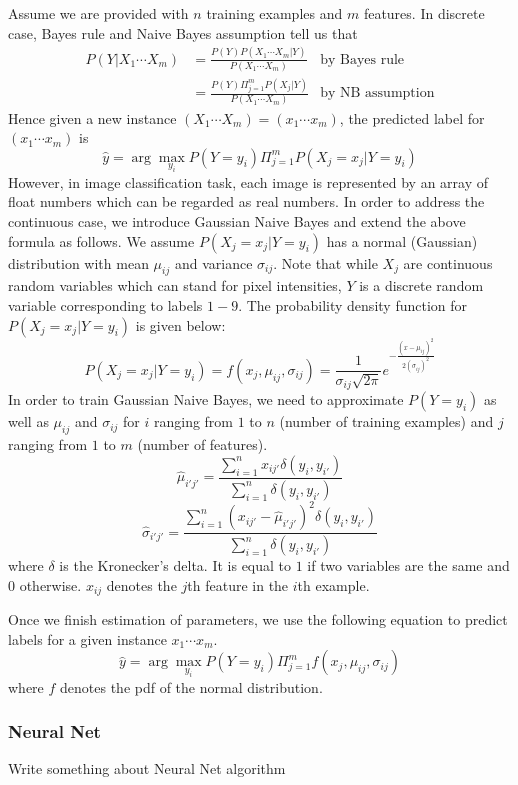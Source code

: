 \documentclass{acm_proc_article-sp}
\begin{document}
Assume we are provided with $n$ training examples and $m$ features. In discrete case, Bayes rule and Naive Bayes assumption tell us that
\begin{align*}
P(Y | X_1 \cdots X_m ) &= \frac{P(Y) P ( X_1 \cdots X_m| Y )}{P(X_1 \cdots X_m)} &\textrm{by Bayes rule}\\
&= \frac{P(Y) \Pi_{j=1}^m  P ( X_j | Y )}{P(X_1 \cdots X_m)} &\textrm{by NB assumption}
\end{align*}
Hence given a new instance $(X_1\cdots X_m) = (x_1\cdots x_m)$, the predicted label for $(x_1\cdots x_m)$ is
\[
\hat{y} = \arg \max_{y_i} P(Y = y_i) \Pi_{j=1}^m P(X_j=x_j | Y = y_i)
\]
However, in image classification task, each image is represented by an array of float numbers which can be regarded as real numbers. In order to address the continuous case, we introduce Gaussian Naive Bayes and extend the above formula as follows. We assume $P(X_j=x_j | Y = y_i)$ has a normal (Gaussian) distribution with mean $\mu_{ij}$ and variance $\sigma_{ij}$. Note that while $X_j$ are continuous random variables which can stand for pixel intensities,  $Y$ is a discrete random variable corresponding to labels $1 - 9$.  The probability density function for $P(X_j=x_j | Y = y_i)$ is given below:
\[
P(X_j=x_j | Y = y_i) =  f (x_j, \mu_{ij}, \sigma_{ij} ) =\frac{1}{\sigma_{ij}\sqrt{2\pi}}e^{-\frac{(x-\mu_{ij})^2}{2(\sigma_{ij})^2}}
\]
In order to train Gaussian Naive Bayes, we need to approximate $P(Y=y_i)$ as well as $\mu_{ij}$ and  $\sigma_{ij}$ for $i$ ranging from $1$ to $n$ (number of training examples) and $j$ ranging from $1$ to $m$ (number of features). 
\[
\hat{\mu}_{i'j'} = \frac{\sum_{i=1}^n x_{ij'} \delta(y_{i}, y_{i'})}{\sum_{i=1}^n \delta(y_{i}, y_{i'})}
\]
\[
\hat{\sigma}_{i'j'} =  \frac{\sum_{i=1}^n ( x_{ij'}-\hat{\mu}_{i'j'})^2 \delta(y_{i}, y_{i'})}{\sum_{i=1}^n \delta(y_{i}, y_{i'})}
\]
where $\delta$ is the Kronecker's delta. It is equal to $1$ if two variables are the same and $0$ otherwise. $x_{ij}$ denotes the $j$th feature in the $i$th  example.


Once we finish estimation of parameters, we use the following equation to predict labels for a given instance $x_1 \cdots x_m$. 
\[
\hat{y} = \arg \max_{y_i} P(Y = y_i) \Pi_{j=1}^m f (x_j, \mu_{ij}, \sigma_{ij} )
\]
where $f$ denotes the pdf of the normal distribution.



\subsubsection{Neural Net}
Write something about Neural Net algorithm
\end{document}
